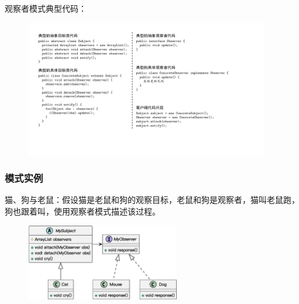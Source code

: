 观察者模式典型代码：
\begin{figure}[H]
    \vspace{-0.5em}
	\centering
	\includegraphics[width=0.95\textwidth]{images/观察者模式典型代码.pdf}
    \vspace{-1em}
\end{figure}

\subsubsection{模式实例}
猫、狗与老鼠：假设猫是老鼠和狗的观察目标，老鼠和狗是观察者，猫叫老鼠跑，狗也跟着叫，使用观察者模式描述该过程。
\begin{figure}[H]
    \vspace{-0.5em}
	\centering
	\includegraphics[width=0.6\textwidth]{images/观察者模式实例1.eps}
    \vspace{-1em}
\end{figure}

